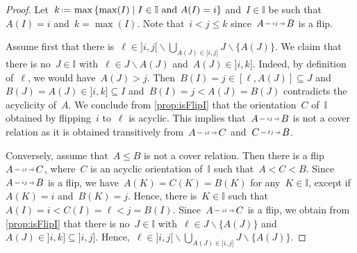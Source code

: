 \documentclass{amsart}
\theoremstyle{definition}
\newcommand{\set}[2]{\left\{ #1 \;\middle|\; #2 \right\}} %
\newcommand{\ssm}{\smallsetminus} %
\newcommand{\eqdef}{\mbox{\,\raisebox{0.2ex}{\scriptsize\ensuremath{\mathrm:}}\ensuremath{=}\,}} %
\newcommand{\II}{\mathbb I} %
\newcommand{\flip}[4]{\ensuremath{#1 \, \begin{tikzpicture}[scale=1,baseline=-.1cm] \path[->]  (0,0) edge node[fill=white,inner sep=2pt, font=\tiny ] {$#2#3$} (.7,0); \end{tikzpicture} \, #4}}
\begin{document}
\begin{proof}
Let~$k \eqdef \max\set{\max(I)}{I \in \II \text{ and } A(I) = i}$ and~$I \in \II$ be such that~$A(I) = i$ and~${k = \max(I)}$.
Note that~$i < j \le k$ since~$\flip{A}{i}{j}{B}$ is a flip.

Assume first that there is~$\ell \in {]i,j[} \ssm \bigcup_{A(J) \in {]i,j]}} J \ssm \{A(J)\}$.
We claim that there is no~$J \in \II$ with~$\ell \in J \ssm A(J)$ and~$A(J) \in {]i,k]}$.
Indeed, by definition of~$\ell$, we would have~$A(J) > j$.
Then~$B(I) = j \in [\ell, A(J)] \subseteq J$ and~$B(J) = A(J) \in {]i,k]} \subseteq I$ and~$B(I) = j < A(J) = B(J)$ contradicts the acyclicity of~$A$.
We conclude from \cref{prop:isFlipI} that the orientation~$C$ of~$\II$ obtained by flipping~$i$ to~$\ell$ is acyclic.
This implies that~$\flip{A}{i}{j}{B}$ is not a cover relation as it is obtained transitively from~$\flip{A}{i}{\ell}{C}$ and~$\flip{C}{\ell}{j}{B}$.

Conversely, assume that~$A \le B$ is not a cover relation.
Then there is a flip~$\flip{A}{i}{\ell}{C}$, where~$C$ is an acyclic orientation of~$\II$ such that~$A < C < B$.
Since~$\flip{A}{i}{j}{B}$ is a flip, we have~${A(K) = C(K) = B(K)}$ for any~$K \in \II$, except if~$A(K) = i$ and~$B(K) = j$.
Hence, there is~$K \in \II$ such that~$A(I) = i < C(I) = \ell < j = B(I)$.
Since~$\flip{A}{i}{\ell}{C}$ is a flip, we obtain from \cref{prop:isFlipI} that there is no~$J \in \II$ with~$\ell \in J \ssm \{A(J)\}$ and~$A(J) \in {]i,k]} \subseteq {]i,j]}$.
Hence,~$\ell \in {]i,j[} \ssm \bigcup_{A(J) \in {]i,j]}} J \ssm \{A(J)\}$.
\end{proof}
\end{document}
